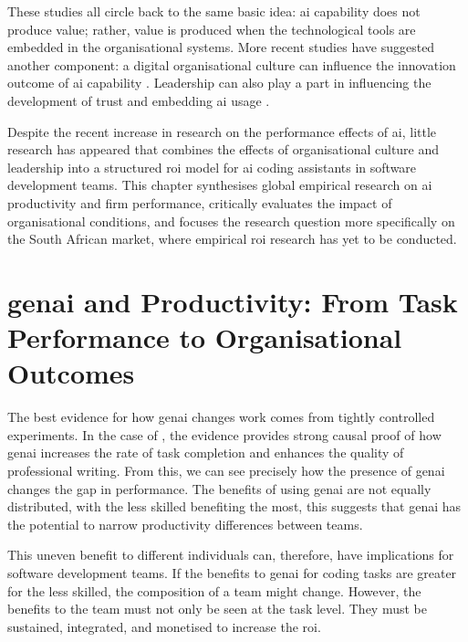 These studies all circle back to the same basic idea: \gls{ai} capability does not produce value; rather, value is produced when the technological tools are embedded in the organisational systems. More recent studies have suggested another component: a digital organisational culture can influence the innovation outcome of \gls{ai} capability \autocite{An2024}. Leadership can also play a part in influencing the development of trust and embedding \gls{ai} usage \autocite{Schneider2023}.

Despite the recent increase in research on the performance effects of \gls{ai}, little research has appeared that combines the effects of organisational culture and leadership into a structured \gls{roi} model for \gls{ai} coding assistants in software development teams. This chapter synthesises global empirical research on \gls{ai} productivity and firm performance, critically evaluates the impact of organisational conditions, and focuses the research question more specifically on the South African market, where empirical \gls{roi} research has yet to be conducted.

\section{\gls{genai} and Productivity: From Task Performance to Organisational Outcomes}
\label{sec:Generative AI and Productivity: From Task Performance to Organisational Outcomes}

The best evidence for how \gls{genai} changes work comes from tightly controlled 
experiments. In the case of \textcite{Noy2023}, the evidence provides strong causal proof of how \gls{genai} increases the rate of task completion and enhances the quality of professional writing. From this, we can see precisely how the presence of \gls{genai} changes the gap in performance. The benefits of using \gls{genai} are not equally distributed, with the less skilled benefiting the most, this suggests that \gls{genai} has the potential to narrow productivity differences between teams.

This uneven benefit to different individuals can, therefore, have implications for software development teams. If the benefits to \gls{genai} for coding tasks are greater for the less skilled, the composition of a team might change. However, the benefits to the team must not only be seen at the task level. They must be sustained, integrated, and monetised to increase the \gls{roi}.

